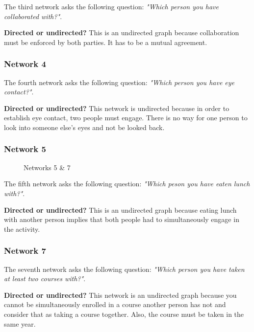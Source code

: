 The third network asks the following question: \textit{"Which person you have collaborated with?"}.

\textbf{Directed or undirected?} This is an undirected graph because collaboration must be enforced by both parties. It has to be a mutual agreement.

\subsubsection{Network 4}
The fourth network asks the following question: \textit{"Which person you have eye contact?"}.

\textbf{Directed or undirected?} This network is undirected because in order to establish eye contact, two people must engage. There is no way for one person to look into someone else's eyes and not be looked back.

\subsubsection{Network 5}
\begin{figure}
    \centering
    \qquad
    \caption{Networks 5 \& 7}
    \label{fig:3}
\end{figure}

The fifth network asks the following question: \textit{"Which peson you have eaten lunch with?"}.

\textbf{Directed or undirected?} This is an undirected graph because eating lunch with another person implies that both people had to simultaneously engage in the activity.

\subsubsection{Network 7}
The seventh network asks the following question: \textit{"Which person you have taken at least two courses with?"}.

\textbf{Directed or undirected?} This network is an undirected graph because you cannot be simultaneously enrolled in a course another person has not and consider that as taking a course together. Also, the course must be taken in the same year.